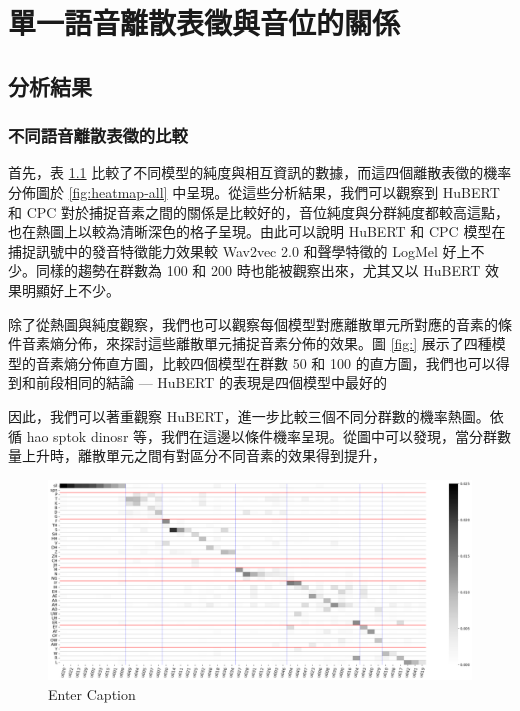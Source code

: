 \chapter{單一語音離散表徵與音位的關係} 

\section{分析結果}

\subsection{不同語音離散表徵的比較}



        首先，表 \ref{fig:enter-label} 比較了不同模型的純度與相互資訊的數據，而這四個離散表徵的機率分佈圖於 \ref{fig:heatmap-all} 中呈現。從這些分析結果，我們可以觀察到 HuBERT 和 CPC 對於捕捉音素之間的關係是比較好的，音位純度與分群純度都較高這點，也在熱圖上以較為清晰深色的格子呈現。由此可以說明 HuBERT 和 CPC 模型在捕捉訊號中的發音特徵能力效果較 Wav2vec 2.0 和聲學特徵的 LogMel 好上不少。同樣的趨勢在群數為 100 和 200 時也能被觀察出來，尤其又以 HuBERT 效果明顯好上不少。

        除了從熱圖與純度觀察，我們也可以觀察每個模型對應離散單元所對應的音素的條件音素熵分佈，來探討這些離散單元捕捉音素分佈的效果。圖 \ref{fig:} 展示了四種模型的音素熵分佈直方圖，比較四個模型在群數 50 和 100 的直方圖，我們也可以得到和前段相同的結論 --- HuBERT 的表現是四個模型中最好的

        因此，我們可以著重觀察 HuBERT，進一步比較三個不同分群數的機率熱圖。依循 hao sptok dinosr 等，我們在這邊以條件機率呈現。從圖中可以發現，當分群數量上升時，離散單元之間有對區分不同音素的效果得到提升，

\begin{figure}
    \centering
    \includegraphics[width=0.5\linewidth]{1.png}
    \caption{Enter Caption}
    \label{fig:enter-label}
\end{figure}

